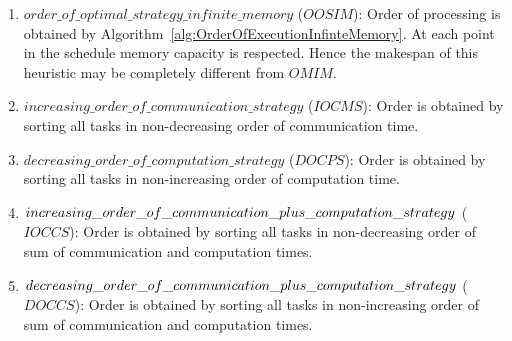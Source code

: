 \documentclass[sigconf]{acmart}
\begin{document}
	
	\begin{enumerate}[label=\roman*)]
		\item $order  \_ \allowbreak  \allowbreak of  \_ \allowbreak  \allowbreak optimal \_ \allowbreak strategy \_ \allowbreak infinite \_ \allowbreak memory $ ($OOSIM$): Order of processing is obtained by Algorithm~\ref{alg:OrderOfExecutionInfinteMemory}. At each point in the schedule memory capacity is respected. Hence the makespan of this heuristic may be completely different from $OMIM$.
		
		\item $increasing \_ \allowbreak order \_ \allowbreak of \_ \allowbreak communication \_ \allowbreak strategy$ ($IOCMS$): Order is obtained by sorting all tasks in non-decreasing order of communication time. 
		
		\item $decreasing \_ \allowbreak order \_ \allowbreak of \_ \allowbreak computation \_ \allowbreak strategy$ ($DOCPS$): Order is obtained by sorting all tasks in non-increasing order of computation time. 
		\item $increasing \_ \allowbreak order \_ \allowbreak of \_ \allowbreak communication \_ \allowbreak plus \_ \allowbreak computation \_ \linebreak[4] \allowbreak strategy$ ($IOCCS$): Order is obtained by sorting all tasks in non-decreasing order of sum of communication and computation times.
		\item $decreasing \_ \allowbreak order \_ \allowbreak of \_ \allowbreak communication \_ \allowbreak plus \_ \allowbreak computation \_ \linebreak[4] \allowbreak strategy$ ($DOCCS$): Order is obtained by sorting all tasks in non-increasing order of sum of communication and computation times.
		
	\end{enumerate}
\end{document}
